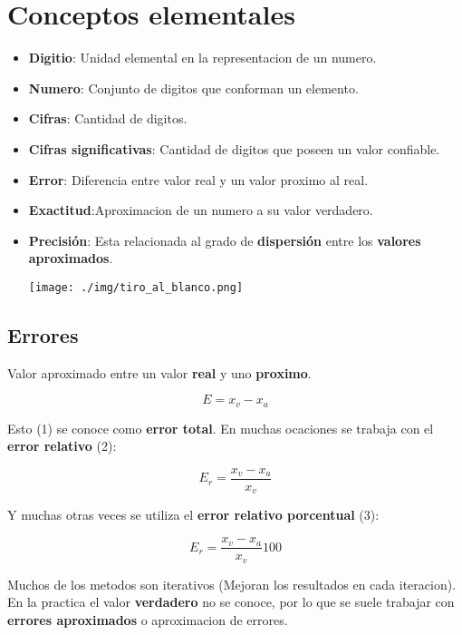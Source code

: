 \documentclass[10pt]{article}
\begin{document}
\section{Conceptos elementales}

\begin{itemize}
	\item \textbf{Digitio}: Unidad elemental en la representacion de un numero.
	\item \textbf{Numero}: Conjunto de digitos que conforman un elemento.
	\item \textbf{Cifras}: Cantidad de digitos.
	\item \textbf{Cifras significativas}: Cantidad de digitos que poseen un valor confiable.
	\item \textbf{Error}: Diferencia entre valor real y un valor proximo al real.
	\item \textbf{Exactitud}:Aproximacion de un numero a su valor verdadero.
	\item \textbf{Precisión}: Esta relacionada al grado de \textbf{dispersión} 
	entre los \textbf{valores aproximados}.
	
	\texttt{[image: ./img/tiro\_al\_blanco.png]}
\end{itemize}

\subsection{Errores}

Valor aproximado entre un valor \textbf{real} y uno \textbf{proximo}.

\begin{equation}
	E = x_v - x_a
\end{equation}

Esto (1) se conoce como \textbf{error total}. En muchas ocaciones se trabaja
con el \textbf{error relativo} (2):

\begin{equation}
	E_r = \dfrac{x_v - x_a}{x_v}
\end{equation}

Y muchas otras veces se utiliza el \textbf{error relativo porcentual} (3):

\begin{equation}
	E_r = \dfrac{x_v - x_a}{x_v} 100%
\end{equation}

Muchos de los metodos son iterativos (Mejoran los resultados en cada iteracion). 
En la practica el valor \textbf{verdadero} no se conoce, por lo que se suele
trabajar con \textbf{errores aproximados} o aproximacion de errores.
\end{document}
